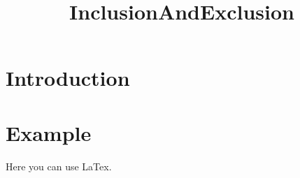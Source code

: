 \title{InclusionAndExclusion}




\maketitle


\tableofcontents
\section{Introduction}



\section{Example}

\nocite{*} %

Here you can use LaTex.


